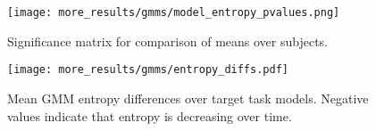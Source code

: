 \documentclass[../main.tex]{subfiles}
\begin{document}
\begin{figure}[H]%
  \centering
    \texttt{[image: more\_results/gmms/model\_entropy\_pvalues.png]}
    \caption[GMM entropy significance matrix]{Significance matrix for comparison of means over subjects.}\label{fig:gmm_entropy_pvalues}
\end{figure}

\begin{figure}[H]%
  \centering
    \texttt{[image: more\_results/gmms/entropy\_diffs.pdf]}
    \caption[Successive GMM entropy differences]{Mean GMM entropy differences over target task models. Negative values indicate that entropy is decreasing over time.}\label{fig:gmm_entropy_diffs}
\end{figure}





\end{document}

